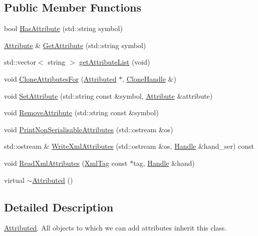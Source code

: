 \subsection*{Public Member Functions}
\begin{DoxyCompactItemize}
\item 
bool \hyperlink{classcfglib_1_1Attributed_a7a9a828f1cd9fcd11bfcb5bed166d132}{Has\+Attribute} (std\+::string symbol)
\item 
\hyperlink{classcfglib_1_1Attribute}{Attribute} \& \hyperlink{classcfglib_1_1Attributed_a78db2f7e006d00bf860b32761ec2c88d}{Get\+Attribute} (std\+::string symbol)
\item 
std\+::vector$<$ string $>$ \hyperlink{classcfglib_1_1Attributed_ab61bf9157b32995f4b0dfcc61cc0b35b}{get\+Attribute\+List} (void)
\item 
void \hyperlink{classcfglib_1_1Attributed_aa0bca88f8daee79c5ab66883608e700c}{Clone\+Attributes\+For} (\hyperlink{classcfglib_1_1Attributed}{Attributed} $\ast$, \hyperlink{classcfglib_1_1CloneHandle}{Clone\+Handle} \&)
\item 
void \hyperlink{classcfglib_1_1Attributed_a354c313adbd2b325718c2e3c3127edc6}{Set\+Attribute} (std\+::string const \&symbol, \hyperlink{classcfglib_1_1Attribute}{Attribute} \&attribute)
\item 
void \hyperlink{classcfglib_1_1Attributed_a725edd325af54006acfb25b4cf8760fd}{Remove\+Attribute} (std\+::string const \&symbol)
\item 
void \hyperlink{classcfglib_1_1Attributed_a8952d975e36fc5d1a824ff0d27dfc0df}{Print\+Non\+Serialisable\+Attributes} (std\+::ostream \&os)
\item 
std\+::ostream \& \hyperlink{classcfglib_1_1Attributed_af1cf65adeb481619018088533a7dc306}{Write\+Xml\+Attributes} (std\+::ostream \&os, \hyperlink{classcfglib_1_1Handle}{Handle} \&hand\+\_\+ser) const
\item 
void \hyperlink{classcfglib_1_1Attributed_afd7bf0f8c2321dbd5c7206ece7da1393}{Read\+Xml\+Attributes} (\hyperlink{classXmlTag}{Xml\+Tag} const $\ast$tag, \hyperlink{classcfglib_1_1Handle}{Handle} \&hand)
\item 
virtual \hyperlink{classcfglib_1_1Attributed_adb9f15c2776aa3976b5a3eff54d3cde7}{$\sim$\+Attributed} ()
\end{DoxyCompactItemize}


\subsection{Detailed Description}
\hyperlink{classcfglib_1_1Attributed}{Attributed}. All objects to which we can add attributes inherit this class. 

